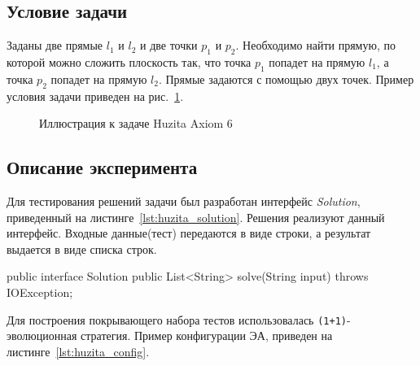 \subsection{Условие задачи}
Заданы две прямые $l_1$ и $l_2$ и две точки $p_1$ и $p_2$. Необходимо найти прямую, по которой можно сложить плоскость так, что точка $p_1$ попадет на прямую 
$l_1$, а точка $p_2$ попадет на прямую $l_2$. Прямые задаются с помощью двух точек. Пример условия задачи приведен на рис.~\ref{huzita_pic}.
\begin{figure}[h!]
 \caption{Иллюстрация к задаче  Huzita Axiom 6}
 \label{huzita_pic}
\end{figure}

\subsection{Описание эксперимента}

Для тестирования решений задачи был разработан интерфейс \textit{Solution}, приведенный на листинге~\ref{lst:huzita_solution}. Решения реализуют данный 
интерфейс. Входные данные(тест) передаются в виде строки, а результат выдается в виде списка строк.

\begin{snippet}[language=Java,caption={Интерфейс решения задачи Huzita Axiom 6},label={lst:huzita_solution}]
public interface Solution {
    public List<String> solve(String input) throws IOException;
}
\end{snippet}

Для построения покрывающего набора тестов использовалась \texttt{(1+1)}-эволюционная стратегия. Пример конфигурации ЭА, приведен на 
листинге~\ref{lst:huzita_config}.

